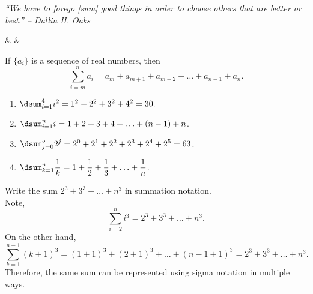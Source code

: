 \documentclass{book}
\begin{document}
\pagebreak

\begin{center} 
\emph{``We have to forego [sum] good things in order to choose others that are better or best.'' -- Dallin H. Oaks}
\end{center}

\begin{Videos}
 &
  &
\end{Videos}

\begin{Def} If $\{a_i\}$ is a sequence of real numbers, then 
\[\sum_{i=m}^n a_i = a_m + a_{m+1} + a_{m+2} + \ldots + a_{n-1} + a_n.\]
\end{Def}\vs

\begin{Exam} \mbox{}
\begin{enumerate}
\item $\dsum_{i=1}^4 i^2 = 1^2 + 2^2 + 3^2 + 4^2 = 30.$\\

\item $\dsum_{i=1}^n i = 1 + 2 + 3 + 4 + \ldots + (n-1) + n$.\\

\item $\dsum_{j=0}^5 2^j = 2^0 + 2^1 + 2^2 + 2^3 + 2^4 + 2^5 = 63$.\\

\item $\dsum_{k=1}^n \dfrac{1}{k} = 1 + \dfrac{1}{2} + \dfrac{1}{3} + \ldots + \dfrac{1}{n}$. 
\end{enumerate}
\end{Exam}\vs

\begin{Exam} Write the sum $2^3 + 3^3 + \ldots +n^3$ in summation notation.\\

Note, \[\sum_{i=2}^n i^3 = 2^3 + 3^3 + \ldots + n^3.\] On the other hand, \[\sum_{k=1}^{n-1} (k+1)^3 = (1+1)^3 + (2+1)^3 + \ldots + (n-1+1)^3 = 2^3+3^3 + \ldots + n^3.\] Therefore, the same sum can be represented using sigma notation in multiple ways. 
\end{Exam}\vs
\end{document}
